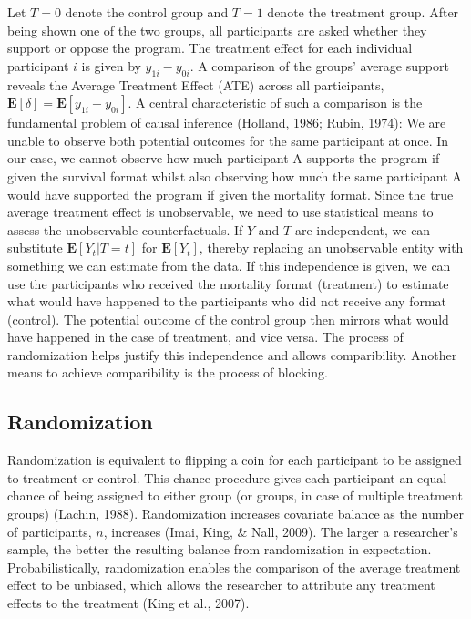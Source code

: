 \documentclass[12pt,econ]{sources/authesis}
\begin{document}
Let \(T=0\) denote the control group and \(T=1\) denote the treatment group. After being shown one of the two groups, all participants are asked whether they support or oppose the program. The treatment effect for each individual participant \(i\) is given by \(y_{1i} - y_{0i}\). A comparison of the groups' average support reveals the Average Treatment Effect (ATE) across all participants, \(\mathbf{E}[\delta] = \mathbf{E}[y_{1i} - y_{0i}]\). A central characteristic of such a comparison is the fundamental problem of causal inference (Holland, 1986; Rubin, 1974): We are unable to observe both potential outcomes for the same participant at once. In our case, we cannot observe how much participant A supports the program if given the survival format whilst also observing how much the same participant A would have supported the program if given the mortality format. Since the true average treatment effect is unobservable, we need to use statistical means to assess the unobservable counterfactuals. If \(Y\) and \(T\) are independent, we can substitute \(\mathbf{E}[Y_t|T=t]\) for \(\mathbf{E}[Y_t]\), thereby replacing an unobservable entity with something we can estimate from the data. If this independence is given, we can use the participants who received the mortality format (treatment) to estimate what would have happened to the participants who did not receive any format (control). The potential outcome of the control group then mirrors what would have happened in the case of treatment, and vice versa. The process of randomization helps justify this independence and allows comparibility. Another means to achieve comparibility is the process of blocking.

\hypertarget{ordblock-theory-randomization}{%
\subsection{Randomization}\label{ordblock-theory-randomization}}

Randomization is equivalent to flipping a coin for each participant to be assigned to treatment or control. This chance procedure gives each participant an equal chance of being assigned to either group (or groups, in case of multiple treatment groups) (Lachin, 1988). Randomization increases covariate balance as the number of participants, \(n\), increases (Imai, King, \& Nall, 2009). The larger a researcher's sample, the better the resulting balance from randomization in expectation. Probabilistically, randomization enables the comparison of the average treatment effect to be unbiased, which allows the researcher to attribute any treatment effects to the treatment (King et al., 2007).
\end{document}
